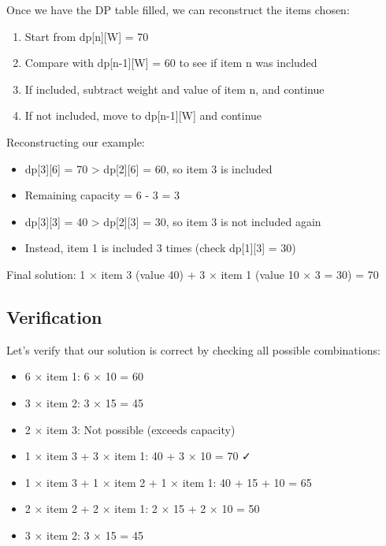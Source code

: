 \documentclass{article}
\begin{document}
\begin{tcolorbox}[notebox, title=Finding the Items in the Optimal Solution]
Once we have the DP table filled, we can reconstruct the items chosen:

\begin{enumerate}
    \item Start from dp[n][W] = 70
    \item Compare with dp[n-1][W] = 60 to see if item n was included
    \item If included, subtract weight and value of item n, and continue
    \item If not included, move to dp[n-1][W] and continue
\end{enumerate}

Reconstructing our example:
\begin{itemize}
    \item dp[3][6] = 70 > dp[2][6] = 60, so item 3 is included
    \item Remaining capacity = 6 - 3 = 3
    \item dp[3][3] = 40 > dp[2][3] = 30, so item 3 is not included again
    \item Instead, item 1 is included 3 times (check dp[1][3] = 30)
\end{itemize}

Final solution: 1 × item 3 (value 40) + 3 × item 1 (value 10 × 3 = 30) = 70
\end{tcolorbox}

\subsection{Verification}

Let's verify that our solution is correct by checking all possible combinations:

\begin{itemize}[leftmargin=*]
    \item 6 × item 1: 6 × 10 = 60
    \item 3 × item 2: 3 × 15 = 45
    \item 2 × item 3: Not possible (exceeds capacity)
    \item 1 × item 3 + 3 × item 1: 40 + 3 × 10 = 70 ✓
    \item 1 × item 3 + 1 × item 2 + 1 × item 1: 40 + 15 + 10 = 65
    \item 2 × item 2 + 2 × item 1: 2 × 15 + 2 × 10 = 50
    \item 3 × item 2: 3 × 15 = 45
\end{itemize}
\end{document}
